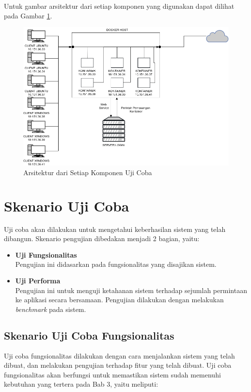 Untuk gambar arsitektur dari setiap komponen yang digunakan dapat dilihat pada Gambar \ref{arsitekturbab5}.

\begin{figure}[H]
	\centering
	\includegraphics[width=\linewidth]{images/bab5/arsitekturbab5}
	\caption{Arsitektur dari Setiap Komponen Uji Coba}
	\label{arsitekturbab5}
\end{figure}


\section{Skenario Uji Coba} \label{skenarioujicoba}
Uji coba akan dilakukan untuk mengetahui keberhasilan sistem yang telah dibangun. Skenario pengujian dibedakan menjadi 2 bagian, yaitu:
\begin{itemize}
	\item \textbf{Uji Fungsionalitas} \\
	Pengujian ini didasarkan pada fungsionalitas yang disajikan sistem.
	\item \textbf{Uji Performa} \\
	Pengujian ini untuk menguji ketahanan sistem terhadap sejumlah permintaan ke aplikasi secara bersamaan. Pengujian dilakukan dengan melakukan \textit{benchmark} pada sistem.
\end{itemize}

\subsection{Skenario Uji Coba Fungsionalitas}
Uji coba fungsionalitas dilakukan dengan cara menjalankan sistem yang telah dibuat, dan melakukan pengujian terhadap fitur yang telah dibuat. Uji coba fungsionalitas akan berfungsi untuk memastikan sistem sudah memenuhi kebutuhan yang tertera pada Bab 3, yaitu meliputi:

